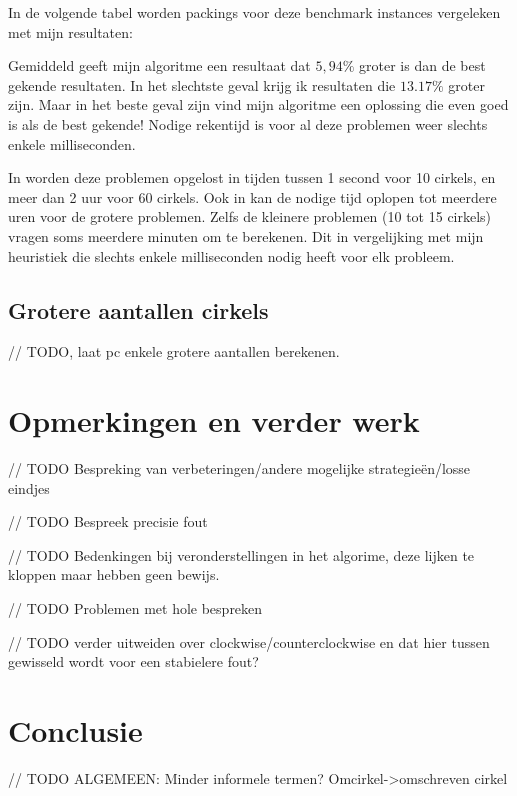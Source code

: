 \documentclass[12pt,a4paper,oneside]{book}
\begin{document}
In de volgende tabel worden packings voor deze benchmark instances vergeleken met mijn resultaten:


Gemiddeld geeft mijn algoritme een resultaat dat $5,94\%$ groter is dan de best gekende resultaten.
In het slechtste geval krijg ik resultaten die $13.17\%$ groter zijn.
Maar in het beste geval zijn vind mijn algoritme een oplossing die even goed is als de best gekende!
Nodige rekentijd is voor al deze problemen weer slechts enkele milliseconden.

In \cite{ye2013iterated} worden deze problemen opgelost in tijden tussen 1 second voor 10 cirkels, en meer dan 2 uur voor 60 cirkels.
Ook in \cite{huang2013tabu} kan de nodige tijd oplopen tot meerdere uren voor de grotere problemen.
Zelfs de kleinere problemen (10 tot 15 cirkels) vragen soms meerdere minuten om te berekenen.
Dit in vergelijking met mijn heuristiek die slechts enkele milliseconden nodig heeft voor elk probleem.

\section{Grotere aantallen cirkels}

// TODO, laat pc enkele grotere aantallen berekenen.

\chapter{Opmerkingen en verder werk} \label{chap:opmerkingen-en-verder-werk}

// TODO Bespreking van verbeteringen/andere mogelijke strategieën/losse eindjes

// TODO Bespreek precisie fout

// TODO Bedenkingen bij veronderstellingen in het algorime, deze lijken te kloppen maar hebben geen bewijs.

// TODO Problemen met hole bespreken

// TODO verder uitweiden over clockwise/counterclockwise en dat hier tussen gewisseld wordt voor een stabielere fout?

\chapter{Conclusie} \label{chap:conclusie}



// TODO ALGEMEEN: Minder informele termen? Omcirkel->omschreven cirkel
\end{document}
